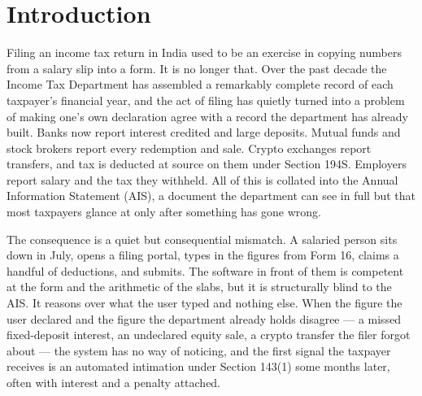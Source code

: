 
\chapter{Introduction}
\label{chap:introduction}

Filing an income tax return in India used to be an exercise in copying numbers
from a salary slip into a form. It is no longer that. Over the past decade the
Income Tax Department has assembled a remarkably complete record of each
taxpayer's financial year, and the act of filing has quietly turned into a
problem of making one's own declaration agree with a record the department has
already built. Banks now report interest credited and large deposits. Mutual
funds and stock brokers report every redemption and sale. Crypto exchanges
report transfers, and tax is deducted at source on them under Section 194S.
Employers report salary and the tax they withheld. All of this is collated into
the Annual Information Statement (AIS), a document the department can see in
full but that most taxpayers glance at only after something has gone wrong.

The consequence is a quiet but consequential mismatch. A salaried person sits
down in July, opens a filing portal, types in the figures from Form 16, claims
a handful of deductions, and submits. The software in front of them is competent
at the form and the arithmetic of the slabs, but it is structurally blind to the
AIS. It reasons over what the user typed and nothing else. When the figure the
user declared and the figure the department already holds disagree --- a missed
fixed-deposit interest, an undeclared equity sale, a crypto transfer the filer
forgot about --- the system has no way of noticing, and the first signal the
taxpayer receives is an automated intimation under Section 143(1) some months
later, often with interest and a penalty attached.

